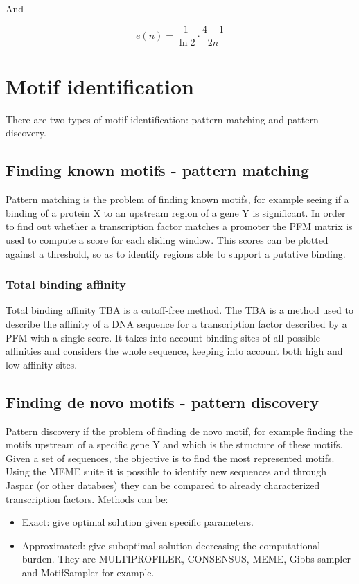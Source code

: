 	And

	$$e(n) = \frac{1}{\ln 2}\cdot \frac{4-1}{2n}$$

\section{Motif identification}
There are two types of motif identification: pattern matching and pattern discovery.

	\subsection{Finding known motifs - pattern matching}
	Pattern matching is the problem of finding known motifs, for example seeing if a binding of a protein X to an upstream region of a gene Y is significant.
	In order to find out whether a transcription factor matches a promoter the PFM matrix is used to compute a score for each sliding window.
	This scores can be plotted against a threshold, so as to identify regions able to support a putative binding.

		\subsubsection{Total binding affinity}
		Total binding affinity TBA is a cutoff-free method.
		The TBA is a method used to describe the affinity of a DNA sequence for a transcription factor described by a PFM with a single score.
		It takes into account binding sites of all possible affinities and considers the whole sequence, keeping into account both high and low affinity sites.

	\subsection{Finding de novo motifs - pattern discovery}
	Pattern discovery if the problem of finding de novo motif, for example finding the motifs upstream of a specific gene Y and which is the structure of these motifs.
	Given a set of sequences, the objective is to find the most represented motifs.
	Using the MEME suite it is possible to identify new sequences and through Jaspar (or other databses) they can be compared to already characterized transcription factors.
	Methods can be:

	\begin{multicols}{2}
		\begin{itemize}
			\item Exact: give optimal solution given specific parameters.
			\item Approximated: give suboptimal solution decreasing the computational burden.
				They are MULTIPROFILER, CONSENSUS, MEME, Gibbs sampler and MotifSampler for example.
		\end{itemize}
	\end{multicols}

